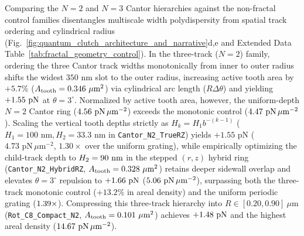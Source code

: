 \documentclass[pdflatex,sn-nature]{sn-jnl}
\DeclareRobustCommand{\roundtwo}[1]{\fpeval{round(#1,2)}}
\DeclareRobustCommand{\roundthree}[1]{\fpeval{round(#1,3)}}
\begin{document}
Comparing the $N=2$ and $N=3$ Cantor hierarchies against the non-fractal control families disentangles multiscale width polydispersity from spatial track ordering and cylindrical radius (Fig.~\ref{fig:quantum_clutch_architecture_and_narrative}d,e and Extended Data Table~\ref{tab:fractal_geometry_control}). In the three-track ($N=2$) family, ordering the three Cantor track widths monotonically from inner to outer radius shifts the widest $350\text{ nm}$ slot to the outer radius, increasing active tooth area by $+5.7\%$ ($A_{\rm tooth} = \roundthree{\FractalCtrlSizematchedMonotonicActiveToothAreaUmtwo}\ \mu\text{m}^2$) via cylindrical arc length ($R\Delta\theta$) and yielding $+\roundtwo{\CtrlSizematchedMonotonicBemThetathreeFZPn}\text{ pN}$ at $\theta=3^\circ$. Normalized by active tooth area, however, the uniform-depth $N=2$ Cantor ring ($\roundtwo{\NatureCantorNtwoFlatzFRepPnPerToothAreaUmtwo}\text{ pN}\,\mu\text{m}^{-2}$) exceeds the monotonic control ($\roundtwo{\NatureCtrlSizematchedMonotonicFRepPnPerToothAreaUmtwo}\text{ pN}\,\mu\text{m}^{-2}$). Scaling the vertical tooth depths strictly as $H_k = H_1 b^{-(k-1)}$ ($H_1 = 100\text{ nm}, H_2 = 33.3\text{ nm}$ in \texttt{Cantor\_N2\_TrueRZ}) yields $+1.55\text{ pN}$ ($4.73\text{ pN}\,\mu\text{m}^{-2}$, $1.30\times$ over the uniform grating), while empirically optimizing the child-track depth to $H_2 = 90{}\text{ nm}$ in the stepped $(r,z)$ hybrid ring (\texttt{Cantor\_N2\_HybridRZ}, $A_{\rm tooth} = \roundthree{\FractalCantorRzScalematchedActiveToothAreaUmtwo}\ \mu\text{m}^2$) retains deeper sidewall overlap and elevates $\theta=3^\circ$ repulsion to $+\roundtwo{\CantorNtwoHybridrzBemStdFZPn}\text{ pN}$ ($\roundtwo{\NatureCantorNtwoHybridrzFRepPnPerToothAreaUmtwo}\text{ pN}\,\mu\text{m}^{-2}$), surpassing both the three-track monotonic control ($+13.2\%$ in areal density) and the uniform periodic grating ($1.39{}\times$). Compressing this three-track hierarchy into $R \in [0.20, 0.90]\ \mu\text{m}$ (\texttt{Rot\_C8\_Compact\_N2}, $A_{\rm tooth} = \roundthree{\RotCeightCompactNtwoStandardThetaZerofoureightpzeroPolarOverlapUmtwo}\ \mu\text{m}^2$) achieves $+\roundtwo{\NatureRotCeightCompactNtwoFRepPn}\text{ pN}$ and the highest areal density ($\roundtwo{\NatureRotCeightCompactNtwoFRepPnPerToothAreaUmtwo}\text{ pN}\,\mu\text{m}^{-2}$).
\end{document}
